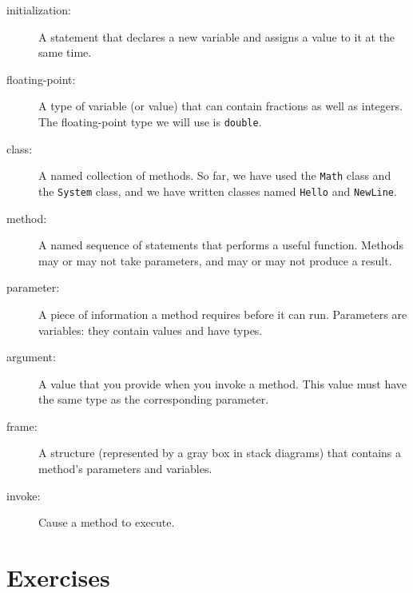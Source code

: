 \documentclass[12pt]{book}
\theoremstyle{definition}
\begin{document}
\begin{description}

\item[initialization:]  A statement that declares a new variable
and assigns a value to it at the same time.

\item[floating-point:] A type of variable (or value) that can contain
fractions as well as integers.  The floating-point type we will
use is {\tt double}.

\item[class:]  A named collection of methods.  So far, we have used
the {\tt Math} class and the {\tt System} class, and we have
written classes named {\tt Hello} and {\tt NewLine}.

\item[method:]  A named sequence of statements that performs a
useful function.  Methods may or may not take parameters, and may
or may not produce a result.

\item[parameter:]  A piece of information a method requires before
it can run.  Parameters are variables: they contain values and have types.

\item[argument:]  A value that you provide when you invoke a
method.  This value must have the same type as the corresponding
parameter.

\item[frame:] A structure (represented by a gray box in stack diagrams)
that contains a method's parameters and variables.

\item[invoke:]  Cause a method to execute.


\end{description}

\section{Exercises}
\end{document}
